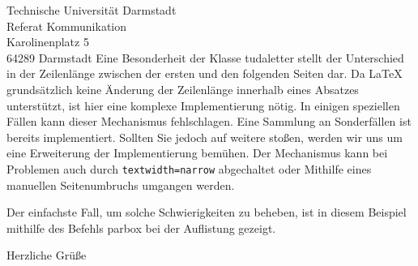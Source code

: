 \documentclass[
	ngerman,
	accentcolor=9c,%
	premium=true,%
]{tudaletter}
\begin{document}
\begin{letter}{%
    Technische Universität Darmstadt\\%
    Referat Kommunikation\\%
    Karolinenplatz 5\\%
    64289 Darmstadt}
Eine Besonderheit der Klasse tudaletter stellt der Unterschied in der Zeilenlänge zwischen der ersten und den folgenden Seiten dar. Da \LaTeX{} grundsätzlich keine Änderung der Zeilenlänge innerhalb eines Absatzes unterstützt, ist hier eine komplexe Implementierung nötig. In einigen speziellen Fällen kann dieser Mechanismus fehlschlagen. Eine Sammlung an Sonderfällen ist bereits implementiert. Sollten Sie jedoch auf weitere stoßen, werden wir uns um eine Erweiterung der Implementierung bemühen. Der Mechanismus kann bei Problemen auch durch \verb+textwidth=narrow+ abgechaltet oder Mithilfe eines manuellen Seitenumbruchs umgangen werden.

Der einfachste Fall, um solche Schwierigkeiten zu beheben, ist in diesem Beispiel mithilfe des Befehls parbox bei der Auflistung gezeigt.

\closing{Herzliche Grüße}


\end{letter}
\end{document}
